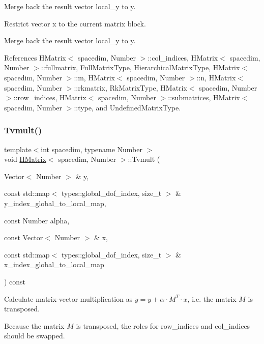 Merge back the result vector {\ttfamily local\+\_\+y} to {\ttfamily y}.

Restrict vector x to the current matrix block.

Merge back the result vector {\ttfamily local\+\_\+y} to {\ttfamily y}.

References H\+Matrix$<$ spacedim, Number $>$\+::col\+\_\+indices, H\+Matrix$<$ spacedim, Number $>$\+::fullmatrix, Full\+Matrix\+Type, Hierarchical\+Matrix\+Type, H\+Matrix$<$ spacedim, Number $>$\+::m, H\+Matrix$<$ spacedim, Number $>$\+::n, H\+Matrix$<$ spacedim, Number $>$\+::rkmatrix, Rk\+Matrix\+Type, H\+Matrix$<$ spacedim, Number $>$\+::row\+\_\+indices, H\+Matrix$<$ spacedim, Number $>$\+::submatrices, H\+Matrix$<$ spacedim, Number $>$\+::type, and Undefined\+Matrix\+Type.

\mbox{\label{classHMatrix_a9ce6e0dd7cfa3dc0fff165d6ed819017}} 
\subsubsection{\texorpdfstring{Tvmult()}{Tvmult()}\hspace{0.1cm}{\footnotesize\ttfamily [4/4]}}
{\footnotesize\ttfamily template$<$int spacedim, typename Number $>$ \\
void \hyperlink{classHMatrix}{H\+Matrix}$<$ spacedim, Number $>$\+::Tvmult (\begin{DoxyParamCaption}\item[{Vector$<$ Number $>$ \&}]{y,  }\item[{const std\+::map$<$ types\+::global\+\_\+dof\+\_\+index, size\+\_\+t $>$ \&}]{y\+\_\+index\+\_\+global\+\_\+to\+\_\+local\+\_\+map,  }\item[{const Number}]{alpha,  }\item[{const Vector$<$ Number $>$ \&}]{x,  }\item[{const std\+::map$<$ types\+::global\+\_\+dof\+\_\+index, size\+\_\+t $>$ \&}]{x\+\_\+index\+\_\+global\+\_\+to\+\_\+local\+\_\+map }\end{DoxyParamCaption}) const}

Calculate matrix-\/vector multiplication as $y = y + \alpha \cdot M^T \cdot x$, i.\+e. the matrix $M$ is transposed.

Because the matrix $M$ is transposed, the roles for {\ttfamily row\+\_\+indices} and {\ttfamily col\+\_\+indices} should be swapped.


